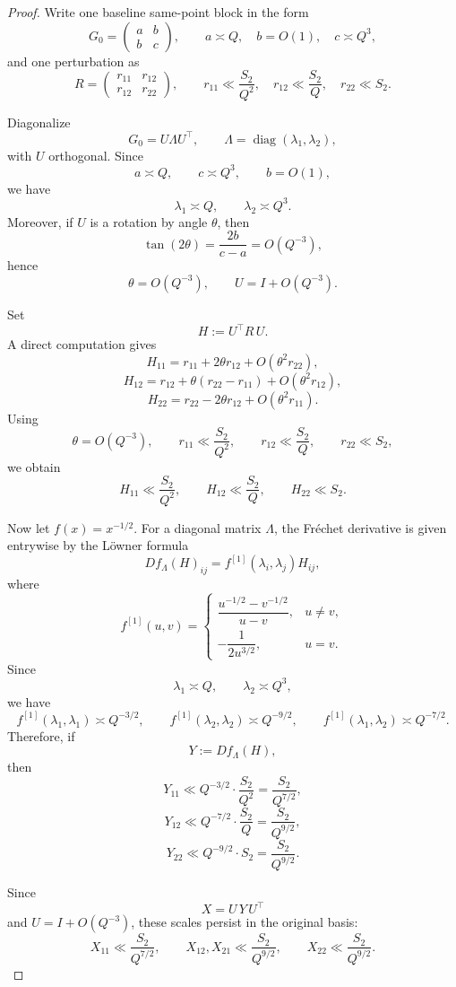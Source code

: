 \documentclass[11pt,a4paper]{amsart}
\theoremstyle{plain}
\theoremstyle{definition}
\begin{document}
\begin{proof}
Write one baseline same-point block in the form
\[
G_0=
\begin{pmatrix}
a & b\\
b & c
\end{pmatrix},
\qquad
a\asymp Q,\quad b=O(1),\quad c\asymp Q^3,
\]
and one perturbation as
\[
R=
\begin{pmatrix}
r_{11} & r_{12}\\
r_{12} & r_{22}
\end{pmatrix},
\qquad
r_{11}\ll \frac{S_2}{Q^2},\quad
r_{12}\ll \frac{S_2}{Q},\quad
r_{22}\ll S_2.
\]

Diagonalize
\[
G_0=U\Lambda U^\top,
\qquad
\Lambda=\operatorname{diag}(\lambda_1,\lambda_2),
\]
with $U$ orthogonal. Since
\[
a\asymp Q,\qquad c\asymp Q^3,\qquad b=O(1),
\]
we have
\[
\lambda_1\asymp Q,\qquad \lambda_2\asymp Q^3.
\]
Moreover, if $U$ is a rotation by angle $\theta$, then
\[
\tan(2\theta)=\frac{2b}{c-a}=O(Q^{-3}),
\]
hence
\[
\theta=O(Q^{-3}),
\qquad
U=I+O(Q^{-3}).
\]

Set
\[
H:=U^\top R\,U.
\]
A direct computation gives
\[
H_{11}=r_{11}+2\theta r_{12}+O(\theta^2 r_{22}),
\]
\[
H_{12}=r_{12}+\theta(r_{22}-r_{11})+O(\theta^2 r_{12}),
\]
\[
H_{22}=r_{22}-2\theta r_{12}+O(\theta^2 r_{11}).
\]
Using
\[
\theta=O(Q^{-3}),
\qquad
r_{11}\ll \frac{S_2}{Q^2},
\qquad
r_{12}\ll \frac{S_2}{Q},
\qquad
r_{22}\ll S_2,
\]
we obtain
\[
H_{11}\ll \frac{S_2}{Q^2},
\qquad
H_{12}\ll \frac{S_2}{Q},
\qquad
H_{22}\ll S_2.
\]

Now let $f(x)=x^{-1/2}$. For a diagonal matrix $\Lambda$, the Fréchet
derivative is given entrywise by the Löwner formula
\[
Df_\Lambda(H)_{ij}=f^{[1]}(\lambda_i,\lambda_j)H_{ij},
\]
where
\[
f^{[1]}(u,v)=
\begin{cases}
\dfrac{u^{-1/2}-v^{-1/2}}{u-v}, & u\neq v,\\[1.2ex]
-\dfrac{1}{2u^{3/2}}, & u=v.
\end{cases}
\]
Since
\[
\lambda_1\asymp Q,\qquad \lambda_2\asymp Q^3,
\]
we have
\[
f^{[1]}(\lambda_1,\lambda_1)\asymp Q^{-3/2},
\qquad
f^{[1]}(\lambda_2,\lambda_2)\asymp Q^{-9/2},
\qquad
f^{[1]}(\lambda_1,\lambda_2)\asymp Q^{-7/2}.
\]
Therefore, if
\[
Y:=Df_\Lambda(H),
\]
then
\[
Y_{11}\ll Q^{-3/2}\cdot \frac{S_2}{Q^2}
=\frac{S_2}{Q^{7/2}},
\]
\[
Y_{12}\ll Q^{-7/2}\cdot \frac{S_2}{Q}
=\frac{S_2}{Q^{9/2}},
\]
\[
Y_{22}\ll Q^{-9/2}\cdot S_2
=\frac{S_2}{Q^{9/2}}.
\]

Since
\[
X=U\,Y\,U^\top
\]
and $U=I+O(Q^{-3})$, these scales persist in the original basis:
\[
X_{11}\ll \frac{S_2}{Q^{7/2}},
\qquad
X_{12},X_{21}\ll \frac{S_2}{Q^{9/2}},
\qquad
X_{22}\ll \frac{S_2}{Q^{9/2}}.
\]


\end{proof}
\end{document}
